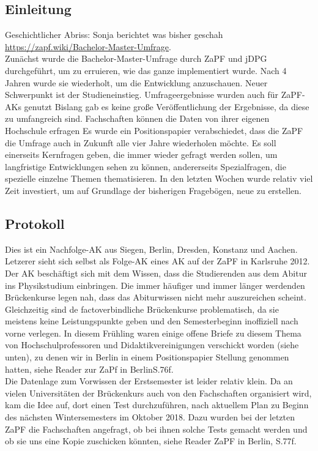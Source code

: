   \subsection*{Einleitung}
    Geschichtlicher Abriss: Sonja berichtet was bisher geschah \url{https://zapf.wiki/Bachelor-Master-Umfrage}. \\
Zunächst wurde die Bachelor-Master-Umfrage durch ZaPF und jDPG  durchgeführt, um zu erruieren, wie das ganze implementiert wurde.
Nach 4 Jahren wurde sie wiederholt, um die Entwicklung anzuschauen. Neuer Schwerpunkt ist der Studieneinstieg.
Umfrageergebnisse wurden auch für ZaPF-AKs genutzt
Bislang gab es keine große Veröffentlichung der Ergebnisse, da diese zu umfangreich sind.
Fachschaften können die Daten von ihrer eigenen Hochschule erfragen
Es wurde ein Positionspapier verabschiedet, dass die ZaPF die Umfrage auch in Zukunft alle vier Jahre wiederholen möchte.
Es soll einerseits Kernfragen geben, die immer wieder gefragt werden sollen, um langfristige Entwicklungen sehen zu können, andererseits Spezialfragen, die spezielle einzelne Themen thematisieren.
In den letzten Wochen wurde relativ viel Zeit investiert, um auf Grundlage der bisherigen Fragebögen, neue zu erstellen.

  \subsection*{Protokoll}
    Dies ist ein Nachfolge-AK aus Siegen, Berlin, Dresden, Konstanz und Aachen. Letzerer sieht sich selbst als Folge-AK eines AK auf der ZaPF in Karlsruhe 2012. \\

    Der AK beschäftigt sich mit dem Wissen, dass die Studierenden aus dem Abitur ins Physikstudium einbringen. Die immer häufiger und immer länger werdenden Brückenkurse legen nah, dass das Abiturwissen nicht mehr auszureichen scheint. Gleichzeitig sind \flqq de facto\frqq verbindliche Brückenkurse problematisch, da sie meistens keine Leistungspunkte geben und den Semesterbeginn inoffiziell nach vorne verlegen. In diesem Frühling waren einige offene Briefe zu diesem Thema von Hochschulprofessoren und Didaktikvereinigungen verschickt worden (siehe unten), zu denen wir in Berlin in einem Positionspapier Stellung genommen hatten, siehe Reader zur \flqq ZaPf in Berlin\frqq S.76f. \\

Die Datenlage zum Vorwissen der Erstsemester ist leider relativ klein. Da an vielen Universitäten der Brückenkurs auch von den Fachschaften organisiert wird, kam die Idee auf, dort einen Test durchzuführen, nach aktuellem Plan zu Beginn des nächsten Wintersemesters im Oktober 2018. Dazu wurden bei der letzten ZaPF die Fachschaften angefragt, ob bei ihnen solche Tests gemacht werden und ob sie uns eine Kopie zuschicken könnten, siehe Reader \flqq ZaPF in Berlin\frqq, S.77f. \\

